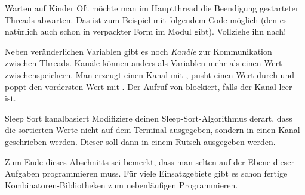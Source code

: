 \documentclass{uebblatt}
\begin{document}
\begin{aufgabe}{Warten auf Kinder}
Oft möchte man im Hauptthread die Beendigung gestarteter Threads abwarten. Das
ist zum Beispiel mit folgendem Code möglich (den es natürlich auch schon in
verpackter Form im Modul  gibt).
Vollziehe ihn nach!

\end{aufgabe}

Neben veränderlichen Variablen gibt es noch \emph{Kanäle} zur Kommunikation
zwischen Threads. Kanäle können anders als Variablen mehr als einen Wert
zwischenspeichern. Man erzeugt einen Kanal mit , pusht einen Wert durch  und poppt den vordersten Wert mit . Der Aufruf von  blockiert, falls der Kanal leer
ist.

\begin{aufgabe}{Sleep Sort kanalbasiert}
Modifiziere deinen Sleep-Sort-Algorithmus derart, dass die sortierten Werte
nicht auf dem Terminal ausgegeben, sondern in einen Kanal geschrieben werden.
Dieser soll dann in einem Rutsch ausgegeben werden. 
\end{aufgabe}

Zum Ende dieses Abschnitts sei bemerkt, dass man selten auf der Ebene dieser
Aufgaben programmieren muss. Für viele Einsatzgebiete gibt es schon fertige
Kombinatoren-Bibliotheken zum nebenläufigen Programmieren.
\end{document}
